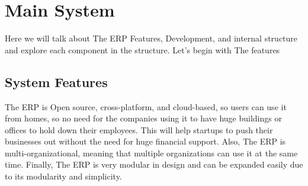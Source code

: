 \section{Main System}
Here we will talk about The ERP Features, Development, and internal structure and explore each component in the structure. Let’s begin with The features

\subsection{System Features}
The ERP is Open source, cross-platform, and cloud-based, so users can use it from homes, so no need for the companies using it to have huge buildings or offices to hold down their employees. This will help startups to push their businesses out without the need for huge financial support. Also, The ERP is multi-organizational, meaning that multiple organizations can use it at the same time. Finally, The ERP is very modular in design and can be expanded easily due to its modularity and simplicity.

